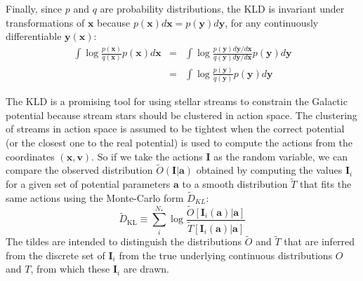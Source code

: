 \documentclass[useAMS,usenatbib,a4paper]{mn2e}
\newcommand{\sub}[2]{\ensuremath{#1_{\mathrm{#2}}}}
\begin{document}

Finally, since $p$ and $q$ are probability distributions, the KLD is invariant under transformations of $\mathbf{x}$ because $p(\mathbf{x}) d\mathbf{x} = p(\mathbf{y}) d\mathbf{y}$, for any continuously differentiable $\mathbf{y}(\mathbf{x})$:
\begin{eqnarray}
  \int  \log \frac{p(\mathbf{x})}{q(\mathbf{x})} p(\mathbf{x}) d\mathbf{x} &=& \int \log \frac{p(\mathbf{y}) d\mathbf{y}/d\mathbf{x}}{q(\mathbf{y})d\mathbf{y}/d\mathbf{x}} p(\mathbf{y}) d\mathbf{y} \nonumber \\
  &=&  \int  \log \frac{p(\mathbf{y})}{q(\mathbf{y})} p(\mathbf{y}) d\mathbf{y} 
\end{eqnarray}


The KLD is a promising tool for using stellar streams to constrain the Galactic potential because stream stars should be clustered in action space. The clustering of streams in action space is assumed to be tightest when the correct potential (or the closest one to the real potential) is used to compute the actions from the coordinates $(\mathbf{x},\mathbf{v})$. So if we take the actions $\mathbf{I}$ as the random variable, we can compare the observed distribution $\tilde{O}(\mathbf{I}|\mathbf{a})$ obtained by computing the values $\mathbf{I}_i$ for a given set of potential parameters $\mathbf{a}$ to a smooth distribution $\tilde{T}$ that fits the same actions using the Monte-Carlo form $\tilde{D}_{KL}$:
\begin{equation}
\label{eq:KLD_perfect}
\sub{\tilde{D}}{KL} \equiv \sum_i^{N_*} \log \frac{\tilde{O}[\mathbf{I}_i(\mathbf{a})|\mathbf{a}]}{\tilde{T}[\mathbf{I}_i(\mathbf{a})|\mathbf{a}]}
\end{equation}
The tildes are intended to distinguish the distributions $\tilde{O}$ and $\tilde{T}$ that are inferred from the discrete set of $\mathbf{I}_i$ from the true underlying continuous distributions $O$ and $T$, from which these $\mathbf{I}_i$ are drawn.
\end{document}
